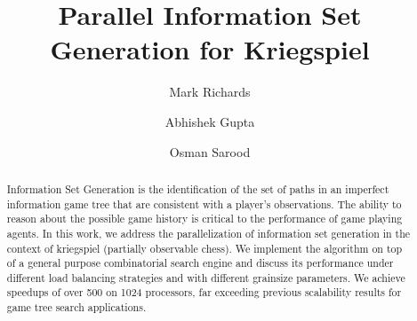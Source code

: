 \documentclass[times, 10pt,twocolumn]{article}
\begin{document}
\title{Parallel Information Set Generation for Kriegspiel 
       }

\author{Mark Richards \and Abhishek Gupta \and Osman Sarood \\
}

\maketitle
\thispagestyle{empty}



\begin{abstract}
Information Set Generation is the identification of the set of paths in an imperfect information game tree that are
consistent with a player's observations.  The ability to reason about the possible game history is critical to the
performance of game playing agents.  In this work, we address the parallelization of information set generation in the context
of kriegspiel (partially observable chess).  We implement the algorithm on top of a general purpose combinatorial search
engine and discuss its performance under different load balancing strategies and with different grainsize parameters.
We achieve speedups of over 500 on 1024 processors, far exceeding previous scalability results for game tree search applications.
\end{abstract}
\end{document}
